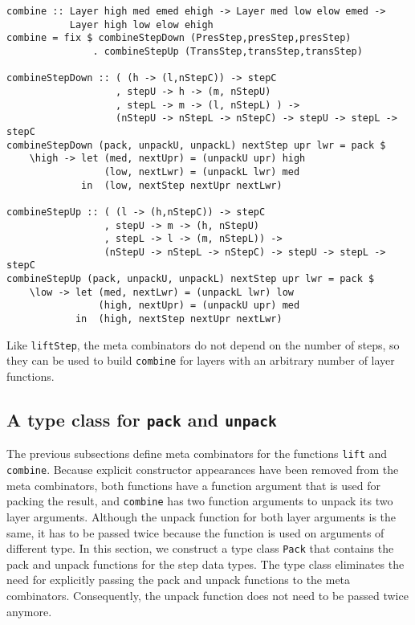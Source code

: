 \begin{small}
\begin{verbatim}
combine :: Layer high med emed ehigh -> Layer med low elow emed -> 
           Layer high low elow ehigh
combine = fix $ combineStepDown (PresStep,presStep,presStep) 
               . combineStepUp (TransStep,transStep,transStep) 

combineStepDown :: ( (h -> (l,nStepC)) -> stepC 
                   , stepU -> h -> (m, nStepU)
                   , stepL -> m -> (l, nStepL) ) -> 
                   (nStepU -> nStepL -> nStepC) -> stepU -> stepL -> stepC
combineStepDown (pack, unpackU, unpackL) nextStep upr lwr = pack $
    \high -> let (med, nextUpr) = (unpackU upr) high
                 (low, nextLwr) = (unpackL lwr) med
             in  (low, nextStep nextUpr nextLwr)

combineStepUp :: ( (l -> (h,nStepC)) -> stepC 
                 , stepU -> m -> (h, nStepU)
                 , stepL -> l -> (m, nStepL)) -> 
                 (nStepU -> nStepL -> nStepC) -> stepU -> stepL -> stepC
combineStepUp (pack, unpackU, unpackL) nextStep upr lwr = pack $
    \low -> let (med, nextLwr) = (unpackL lwr) low
                (high, nextUpr) = (unpackU upr) med
            in  (high, nextStep nextUpr nextLwr)
\end{verbatim}
\end{small}

Like \texttt{liftStep}, the meta combinators do not depend on the number of steps, so they can be used to build \texttt{combine} for layers with an arbitrary number of layer functions.


\subsection{A type class for \texttt{pack} and \texttt{unpack}} \label{subsecttypeclass}

The previous subsections define meta combinators for the functions \texttt{lift} and \texttt{combine}. Because explicit constructor appearances have been removed from the meta combinators, both functions have a function argument that is used for packing the result, and \texttt{combine} has two function arguments to unpack its two layer arguments. Although the unpack function for both layer arguments is the same, it has to be passed twice because the function is used on arguments of different type. In this section, we construct a type class \texttt{Pack} that contains the pack and unpack functions for the step data types. The type class eliminates the need for explicitly passing the pack and unpack functions to the meta combinators. Consequently, the unpack function does not need to be passed twice anymore. 

